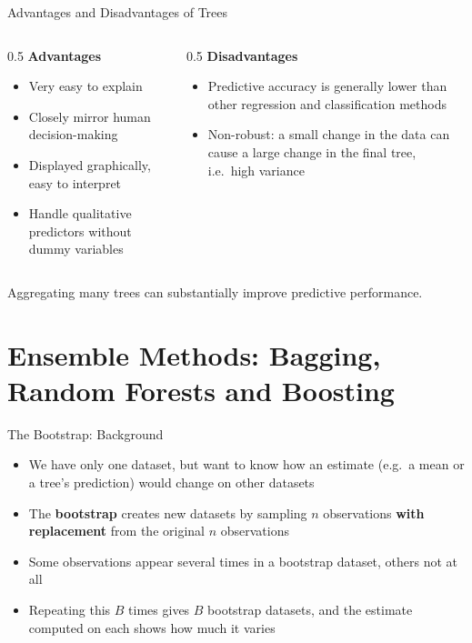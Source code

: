 \begin{frame}{Advantages and Disadvantages of Trees}
    \begin{columns}[T]
        \begin{column}{0.5\textwidth}
            \textbf{Advantages}
            \begin{itemize}
                \item Very easy to explain
                \item Closely mirror human decision-making
                \item Displayed graphically, easy to interpret
                \item Handle qualitative predictors without dummy variables
            \end{itemize}
        \end{column}
        \begin{column}{0.5\textwidth}
            \textbf{Disadvantages}
            \begin{itemize}
                \item Predictive accuracy is generally lower than other regression and classification methods
                \item Non-robust: a small change in the data can cause a large change in the final tree, i.e.\ high variance
            \end{itemize}
        \end{column}
    \end{columns}
    \vspace{1em}
    Aggregating many trees can substantially improve predictive performance.
\end{frame}


\section{Ensemble Methods: Bagging, Random Forests and Boosting}


\begin{frame}{The Bootstrap: Background}
    \begin{itemize}
        \item We have only one dataset, but want to know how an estimate (e.g.\ a mean or a tree's prediction) would change on other datasets
        \item The \textbf{bootstrap} creates new datasets by sampling $n$ observations \textbf{with replacement} from the original $n$ observations
        \item Some observations appear several times in a bootstrap dataset, others not at all
        \item Repeating this $B$ times gives $B$ bootstrap datasets, and the estimate computed on each shows how much it varies
    \end{itemize}
\end{frame}


